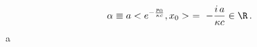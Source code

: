 \begin{equation}\alpha\equiv a
<e^{-\frac{p_0}{\kappa c}} , x_0 > \ = \ -\frac{i\,a}{\kappa c}\in
\R\, .\label{r39}\end{equation}a
